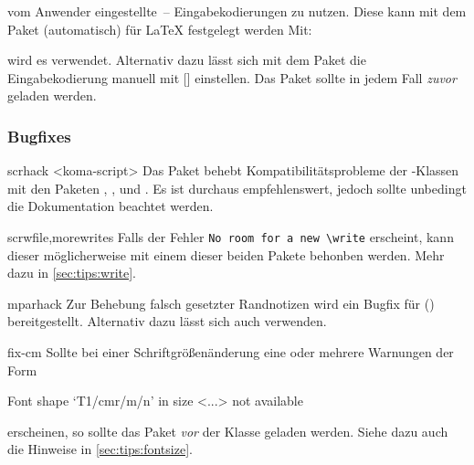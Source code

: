 \begin{packages}
  vom Anwender eingestellte~-- Eingabekodierungen zu nutzen. Diese kann mit dem 
  Paket  (automatisch) für \LaTeX{} festgelegt werden Mit:
  \begin{Code}
    \usepackage{selinput}
  \end{Code}\vspace{-\baselineskip}%
  wird es verwendet. Alternativ dazu lässt sich mit dem Paket 
   die Eingabekodierung manuell mit  
  []  
  einstellen. Das Paket  sollte in jedem Fall \emph{zuvor}
  geladen werden.
\end{packages}


\subsubsection{Bugfixes}
\begin{packages}
\item[scrhack]<koma-script>
  Das Paket behebt Kompatibilitätsprobleme der \KOMAScript-Klassen mit den 
  Paketen , ,  und
  . Es ist durchaus empfehlenswert, jedoch sollte unbedingt 
  die Dokumentation beachtet werden.
\item[scrwfile,morewrites]
  Falls der Fehler \texttt{No room for a new \textbackslash write} erscheint, 
  kann dieser möglicherweise mit einem dieser beiden Pakete behonben werden. 
  Mehr dazu in \autoref{sec:tips:write}.
\item[mparhack]
  Zur Behebung falsch gesetzter Randnotizen wird ein Bugfix für 
  () bereitgestellt. Alternativ dazu 
  lässt sich auch  verwenden.
\item[fix-cm]
  Sollte bei einer Schriftgrößenänderung eine oder mehrere Warnungen der Form
  \begin{Code}
    Font shape `T1/cmr/m/n' in size <...> not available
  \end{Code}\vspace{-\baselineskip}%
  erscheinen, so sollte das Paket  \emph{vor} der Klasse 
  geladen werden. Siehe dazu auch die Hinweise in \autoref{sec:tips:fontsize}.
\end{packages}
